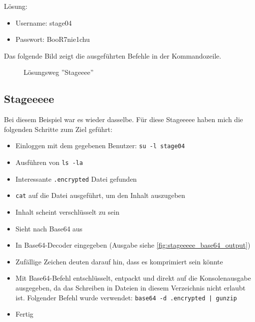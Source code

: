 \documentclass[12pt, a4paper, titlepage, oneside]{scrartcl}
\begin{document}
	Lösung:
	\begin{itemize}
		\item Username: stage04

		\item Passwort: BooR7nie1chu
	\end{itemize}

	Das folgende Bild zeigt die ausgeführten Befehle in der Kommandozeile.
	\begin{figure}[h!]
		\centering
		\caption{Lösungsweg ''Stageeee''}
		\label{fig:stageeee_solution}
	\end{figure}

	\newpage

	\subsection{Stageeeee}
	Bei diesem Beispiel war es wieder dasselbe. Für diese Stageeeee haben mich die
	folgenden Schritte zum Ziel geführt:

	\begin{itemize}
		\item Einloggen mit dem gegebenen Benutzer: \lstinline{su -l stage04}

		\item Ausführen von \lstinline{ls -la}

		\item Interessante \lstinline{.encrypted} Datei gefunden

		\item \lstinline{cat} auf die Datei ausgeführt, um den Inhalt auszugeben

		\item Inhalt scheint verschlüsselt zu sein

		\item Sieht nach Base64 aus

		\item In Base64-Decoder eingegeben (Ausgabe siehe
			\ref{fig:stageeeee_base64_output})

		\item Zufällige Zeichen deuten darauf hin, dass es komprimiert sein könnte

		\item Mit Base64-Befehl entschlüsselt, entpackt und direkt auf die
			Konsolenausgabe ausgegeben, da das Schreiben in Dateien in diesem Verzeichnis
			nicht erlaubt ist. Folgender Befehl wurde verwendet: \lstinline{base64 -d .encrypted | gunzip}

		\item Fertig
	\end{itemize}
\end{document}
